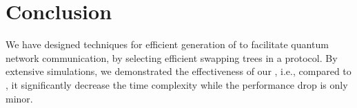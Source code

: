 \vspace{-0.1in}
\section{Conclusion}
\label{sec:swapping_conc}

We have designed techniques for efficient generation of \eps to facilitate quantum
network communication, by selecting efficient swapping trees in a \wt protocol.
By extensive simulations, we demonstrated the effectiveness of our \dpalt, i.e., compared to \dpa, it significantly decrease the time complexity
while the performance drop is only minor.

